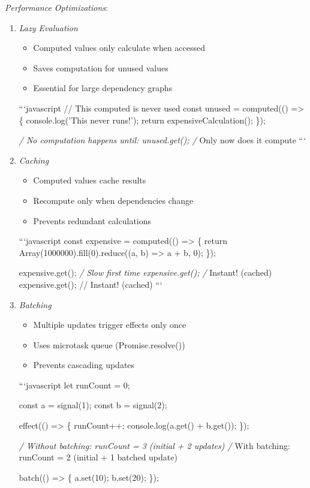 \documentclass[11pt]{article}
\begin{document}
\emph{Performance Optimizations}:

\begin{enumerate}
\item \emph{Lazy Evaluation}
\begin{itemize}
\item Computed values only calculate when accessed
\item Saves computation for unused values
\item Essential for large dependency graphs
\end{itemize}

```javascript
// This computed is never used
const unused = computed(() => \{
  console.log('This never runs!');
  return expensiveCalculation();
\});

\emph{/ No computation happens until:
unused.get(); /} Only now does it compute
```

\item \emph{Caching}
\begin{itemize}
\item Computed values cache results
\item Recompute only when dependencies change
\item Prevents redundant calculations
\end{itemize}

```javascript
const expensive = computed(() => \{
  return Array(1000000).fill(0).reduce((a, b) => a + b, 0);
\});

expensive.get(); \emph{/ Slow first time
expensive.get(); /} Instant! (cached)
expensive.get(); // Instant! (cached)
```

\item \emph{Batching}
\begin{itemize}
\item Multiple updates trigger effects only once
\item Uses microtask queue (Promise.resolve())
\item Prevents cascading updates
\end{itemize}

```javascript
let runCount = 0;

const a = signal(1);
const b = signal(2);

effect(() => \{
  runCount++;
  console.log(a.get() + b.get());
\});

\emph{/ Without batching: runCount = 3 (initial + 2 updates)
/} With batching: runCount = 2 (initial + 1 batched update)

batch(() => \{
  a.set(10);
  b.set(20);
\});


\end{enumerate}
\end{document}
